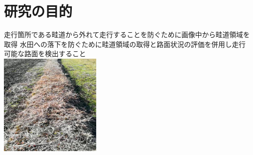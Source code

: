 \chapter{研究の目的}\label{chap:purpose}

走行箇所である畦道から外れて走行することを防ぐために画像中から畦道領域を取得
水田への落下を防ぐために畦道領域の取得と路面状況の評価を併用し走行可能な路面を検出すること
\\
\includegraphics[width=5cm]{figs/fig1.jpg}
